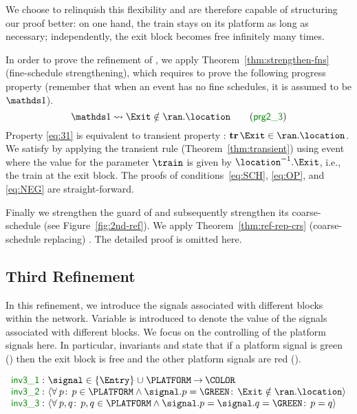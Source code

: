 We choose to relinquish this flexibility and are therefore capable of structuring
our proof better: on one hand, the train stays on its platform as
long as necessary; independently, the exit block becomes free
infinitely many times. 

In order to prove the refinement of \moveout, we apply
Theorem~\ref{thm:strengthen-fns} (fine-schedule strengthening), which
requires to prove the following progress property (remember that when
an event has no fine schedules, it is assumed to be $\one$).
\begin{equation}
  \label{eq:31}
  \one \leadsto \Exit \notin \ran.\location
  \tag{\Binv{prg2\_3}}
\end{equation}
Property
\ref{eq:31} is equivalent to transient property : $\tr
\Exit \in \ran.\location$.  We satisfy  by applying the
transient rule (Theorem~\ref{thm:transient}) using event \depart where
the value for the parameter $\train$ is given by
$\location^{-1}.\Exit$, i.e., the train at the exit block.  The
proofs of conditions~\eqref{eq:SCH}, \eqref{eq:OP}, and \eqref{eq:NEG} are
straight-forward.

Finally we strengthen the guard of \movein and subsequently strengthen
its coarse-schedule (see Figure~\ref{fig:2nd-ref}).  We apply
Theorem~\ref{thm:ref-rep-crs} (coarse-schedule replacing) \movein.
The detailed proof is omitted here.

\subsection{Third Refinement}
\label{sec:third-refinement}


In this refinement, we introduce the signals associated with different
blocks within the network.  Variable \signal is introduced to denote
the value of the signals associated with different blocks.  We focus
on the controlling of the platform signals here.  In particular,
invariants  and  state that if a platform signal is
green (\GREEN) then the exit block is free and the other platform
signals are red (\RED).
  \begin{Bcode}[\footnotesize]
    $ \invariants[false]{ \Binv{inv3\_1}: & \signal \in \{\Entry\}
      \bunion \PLATFORM \tfun
      \COLOR \\
      \Binv{inv3\_2}: & \qforall{p}{p \in \PLATFORM \land \signal.p =
        \GREEN}{\Exit \notin \ran.\location} \\
      \Binv{inv3\_3}: & \qforall{p,q}{p, q \in \PLATFORM \land
        \signal.p = \signal.q = \GREEN}{p = q} } $
  \end{Bcode}

